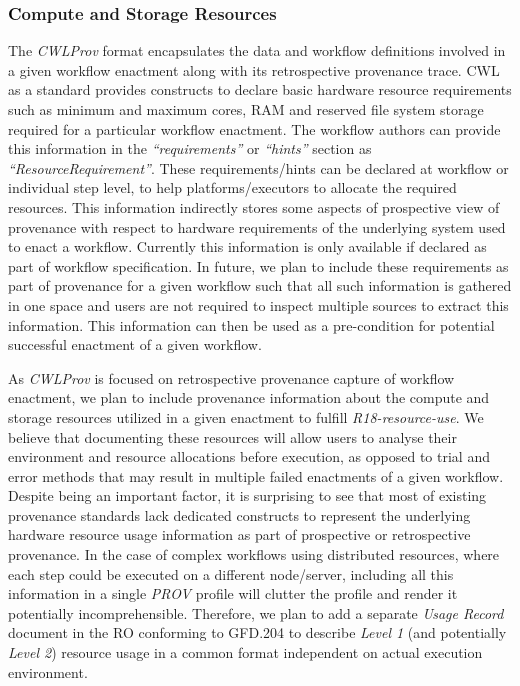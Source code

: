 \documentclass[a4paper,num-refs]{oup-contemporary}
\begin{document}
\subsubsection{\textcolor{black}Compute and Storage Resources}
The \textit{CWLProv} format encapsulates the data and workflow definitions involved in a given workflow enactment along with its retrospective provenance trace. CWL as a standard provides constructs to declare basic hardware resource requirements such as minimum and maximum cores, RAM and reserved file system storage required for a particular workflow enactment. The workflow authors can provide this information in the \textit{``requirements''} or \textit{``hints''} section as \textit{``ResourceRequirement''}. These requirements/hints can be declared at workflow or individual step level, to help platforms/executors to allocate the required resources. This information indirectly stores some aspects of prospective view of provenance with respect to hardware requirements of the underlying system used to enact a workflow. Currently this information is only available if declared as part of workflow specification. In future, we plan to include these requirements as part of provenance for a given workflow such that all such information is gathered in one space and users are not required to inspect multiple sources to extract this information. This information can then be used as a pre-condition for potential successful enactment of a given workflow.
 
 As \textit{CWLProv} is focused on retrospective provenance capture of workflow enactment, we plan to include provenance information about the compute and storage resources utilized in a given enactment to fulfill \textit{R18-resource-use}. We believe that documenting these resources will allow users to analyse their environment and resource allocations before execution, as opposed to trial and error methods that may result in multiple failed enactments of a given workflow. Despite being an important factor, it is surprising to see that most of existing provenance standards lack dedicated constructs to represent the underlying hardware resource usage information as part of prospective or retrospective provenance. In the case of complex workflows using distributed resources, where each step could be executed on a different node/server, including all this information in a single \textit{PROV} profile will clutter the profile and render it potentially incomprehensible. Therefore, we plan to add a separate \textit{Usage Record} document in the RO conforming to GFD.204 \citep{cristofori2013usage} to describe \textit{Level 1} (and potentially \textit{Level 2}) resource usage in a common format independent on actual execution environment. 
 
\end{document}
